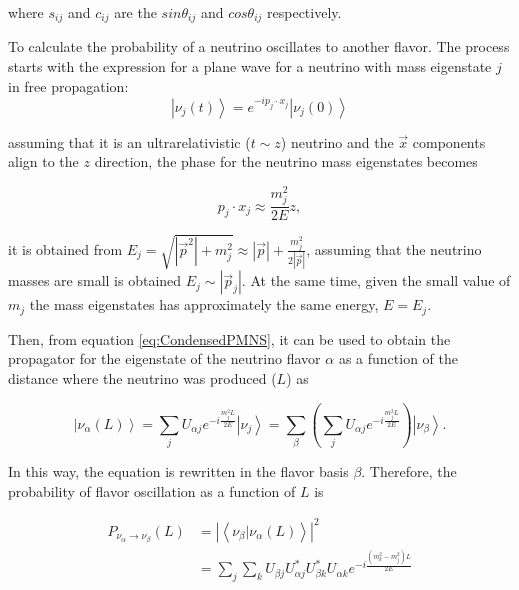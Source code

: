 where $s_{ij}$ and $c_{ij}$ are the $sin \theta_{ij}$ and $cos \theta_{ij}$ respectively. 

To calculate the probability of a neutrino oscillates to another flavor. The process starts  with the expression for a plane wave for a neutrino with mass eigenstate $j$ in free propagation: 
\begin{equation}
    \left| \nu_j (t)\right> = e^{-ip_j\cdot x_j}\left| \nu_j (0)\right>
\end{equation}

assuming that it is an ultrarelativistic ($t\sim z$) neutrino and the $\Vec{x}$ components align to the $z$ direction, the phase for the neutrino mass eigenstates becomes 

\begin{equation}
    p_j\cdot x_j \approx \frac{m^2_j}{2E}z,
\end{equation}

it is obtained from $E_j = \sqrt{|\Vec{p}^2|+m^2_j}\approx |\Vec{p}| + \frac{m^2_j}{2|\Vec{p}|}$, assuming that the neutrino masses are small is obtained $E_j \sim |\Vec{p}_j|$. At the same time, given the small value of $m_j$ the mass eigenstates has approximately the same energy, $E=E_j$.

Then, from equation \ref{eq:CondensedPMNS}, it can be used to obtain the propagator for the eigenstate of the neutrino flavor $\alpha$ as a function of the distance where the neutrino was produced ($L$) as

\begin{equation}
    \left|\nu_\alpha (L)\right> = \sum_j U_{\alpha j}e^{-i\frac{m^2_j L}{2E}}\left|\nu_j \right>=\sum_\beta \left(\sum_j U_{\alpha j}e^{-i\frac{m^2_j L}{2E}}\right)\left|\nu_\beta \right>.
    \label{eq:NeutrinoPropagatorL}
\end{equation}

In this way, the equation is rewritten in the flavor basis $\beta$. Therefore, the probability of flavor oscillation as a function of $L$ is

\begin{equation}
    \begin{split}
        P_{\nu_\alpha\rightarrow\nu_\beta}(L) & =|\left<\nu_\beta | \nu_\alpha(L)\right>|^2 \\
        & = \sum_j\sum_k U_{\beta j} U^*_{\alpha j} U^*_{\beta k} U_{\alpha k} e^{-i\frac{(m^2_k - m^2_j)L}{2E}}
    \end{split}
\end{equation}

